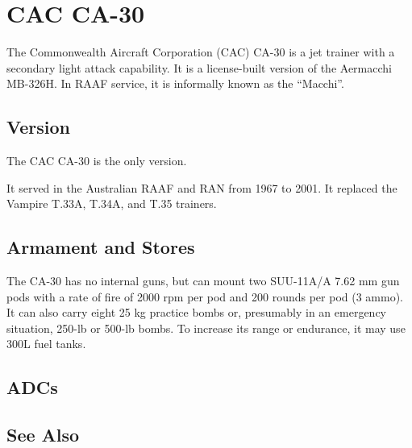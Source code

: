 \section{CAC CA-30}

The Commonwealth Aircraft Corporation (CAC) CA-30 is a jet trainer with a secondary light attack capability. It is a license-built version of the Aermacchi MB-326H. In RAAF service, it is informally known as the “Macchi”.

\subsection{Version}

The CAC CA-30 is the only version.

It served in the Australian RAAF and RAN from 1967 to 2001. It replaced the Vampire T.33A, T.34A, and T.35 trainers.

\subsection{Armament and Stores}

The CA-30 has no internal guns, but can mount two SUU-11A/A 7.62 mm gun pods with a rate of fire of 2000 rpm per pod and 200 rounds per pod (3 ammo). It can also carry eight 25 kg practice bombs or, presumably in an emergency situation, 250-lb or 500-lb bombs. To increase its range or endurance, it may use 300L fuel tanks.

\subsection{ADCs}

\begin{adclist}
\end{adclist}

\subsection{See Also}

\begin{typelist}
\end{typelist}
